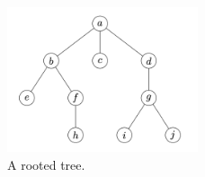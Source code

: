 \begin{figure}
  \centering
  \includegraphics[width=0.5\textwidth]{graphics_included/rooted_tree}
  \caption{A rooted tree.}
  \label{figure:rooted_trees:rooted_tree}
\end{figure}
